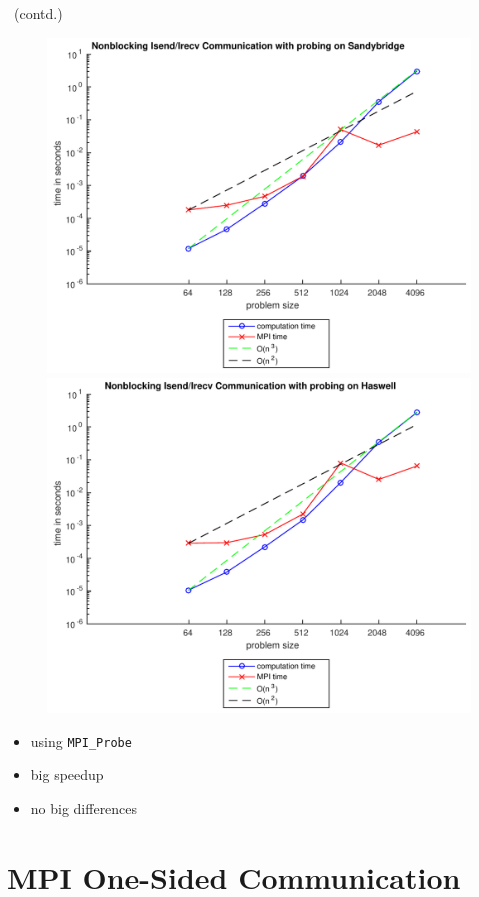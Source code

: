 \documentclass[9pt,pdftex]{beamer}
\begin{document}
\begin{frame}{\insertsubsection \ (contd.)}
\begin{figure}
\includegraphics[width=.5\textwidth]{Pictures/Task4SBprobe}
\hfill
\includegraphics[width=.5\textwidth]{Pictures/Task4HWprobe}
\end{figure}
\begin{itemize}
\item using \lstinline{MPI_Probe}
\item big speedup
\item no big differences
\end{itemize}
\end{frame}

\section{MPI One-Sided Communication}
\begin{frame}{\phantom{Contents}}
\tableofcontents[
  currentsection  
]
\end{frame}
\end{document}
